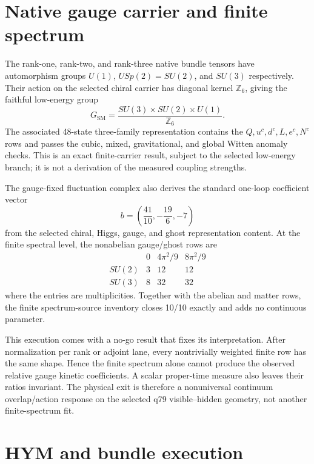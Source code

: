 \documentclass[11pt]{article}
\begin{document}
\section{Native gauge carrier and finite spectrum}

The rank-one, rank-two, and rank-three native bundle tensors have automorphism
groups $U(1)$, $USp(2)=SU(2)$, and $SU(3)$ respectively. Their action on the
selected chiral carrier has diagonal kernel $\mathbb Z_6$, giving the faithful
low-energy group
\[
G_{\mathrm{SM}}
=\frac{SU(3)\times SU(2)\times U(1)}{\mathbb Z_6}.
\]
The associated 48-state three-family representation contains the
$Q,u^c,d^c,L,e^c,N^c$ rows and passes the cubic, mixed, gravitational, and
global Witten anomaly checks. This is an exact finite-carrier result, subject
to the selected low-energy branch; it is not a derivation of the measured
coupling strengths.

The gauge-fixed fluctuation complex also derives the standard one-loop
coefficient vector
\[
b=\left(\frac{41}{10},-\frac{19}{6},-7\right)
\]
from the selected chiral, Higgs, gauge, and ghost representation content. At
the finite spectral level, the nonabelian gauge/ghost rows are
\[
\begin{array}{c|ccc}
 & 0 & 4\pi^2/9 & 8\pi^2/9\\
\hline
SU(2) & 3 & 12 & 12\\
SU(3) & 8 & 32 & 32
\end{array}
\]
where the entries are multiplicities. Together with the abelian and matter
rows, the finite spectrum-source inventory closes 10/10 exactly and adds no
continuous parameter.

This execution comes with a no-go result that fixes its interpretation. After
normalization per rank or adjoint lane, every nontrivially weighted finite row
has the same shape. Hence the finite spectrum alone cannot produce the
observed relative gauge kinetic coefficients. A scalar proper-time measure
also leaves their ratios invariant. The physical exit is therefore a
nonuniversal continuum overlap/action response on the selected q79
visible--hidden geometry, not another finite-spectrum fit.

\section{HYM and bundle execution}
\end{document}
